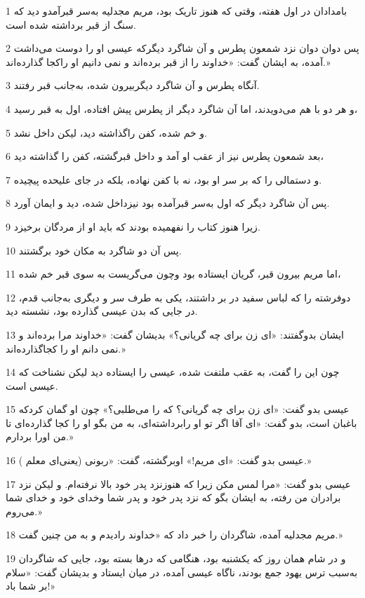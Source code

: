 \par 1 بامدادان در اول هفته، وقتی که هنوز تاریک بود، مریم مجدلیه به‌سر قبر‌آمدو دید که سنگ از قبر برداشته شده است.
\par 2 پس دوان دوان نزد شمعون پطرس و آن شاگرد دیگرکه عیسی او را دوست می‌داشت آمده، به ایشان گفت: «خداوند را از قبر برده‌اند و نمی دانیم او راکجا گذارده‌اند.»
\par 3 آنگاه پطرس و آن شاگرد دیگربیرون شده، به‌جانب قبر رفتند.
\par 4 و هر دو با هم می‌دویدند، اما آن شاگرد دیگر از پطرس پیش افتاده، اول به قبر رسید،
\par 5 و خم شده، کفن راگذاشته دید، لیکن داخل نشد.
\par 6 بعد شمعون پطرس نیز از عقب او آمد و داخل قبرگشته، کفن را گذاشته دید،
\par 7 و دستمالی را که بر سر او بود، نه با کفن نهاده، بلکه در جای علیحده پیچیده.
\par 8 پس آن شاگرد دیگر که اول به‌سر قبر‌آمده بود نیزداخل شده، دید و ایمان آورد.
\par 9 زیرا هنوز کتاب را نفهمیده بودند که باید او از مردگان برخیزد.
\par 10 پس آن دو شاگرد به مکان خود برگشتند.
\par 11 اما مریم بیرون قبر، گریان ایستاده بود وچون می‌گریست به سوی قبر خم شده،
\par 12 دوفرشته را که لباس سفید در بر داشتند، یکی به طرف سر و دیگری به‌جانب قدم، در جایی که بدن عیسی گذارده بود، نشسته دید.
\par 13 ایشان بدوگفتند: «ای زن برای چه گریانی؟» بدیشان گفت: «خداوند مرا برده‌اند و نمی دانم او را کجاگذارده‌اند.»
\par 14 چون این را گفت، به عقب ملتفت شده، عیسی را ایستاده دید لیکن نشناخت که عیسی است.
\par 15 عیسی بدو گفت: «ای زن برای چه گریانی؟ که را می‌طلبی؟» چون او گمان کردکه باغبان است، بدو گفت: «ای آقا اگر تو او رابرداشته‌ای، به من بگو او را کجا گذارده‌ای تا من اورا بردارم.»
\par 16 عیسی بدو گفت: «ای مریم!» اوبرگشته، گفت: «ربونی (یعنی‌ای معلم ).»
\par 17 عیسی بدو گفت: «مرا لمس مکن زیرا که هنوزنزد پدر خود بالا نرفته‌ام. و لیکن نزد برادران من رفته، به ایشان بگو که نزد پدر خود و پدر شما وخدای خود و خدای شما می‌روم.»
\par 18 مریم مجدلیه آمده، شاگردان را خبر داد که «خداوند رادیدم و به من چنین گفت.»
\par 19 و در شام همان روز که یکشنبه بود، هنگامی که درها بسته بود، جایی که شاگردان به‌سبب ترس یهود جمع بودند، ناگاه عیسی آمده، در میان ایستاد و بدیشان گفت: «سلام بر شما باد!»
